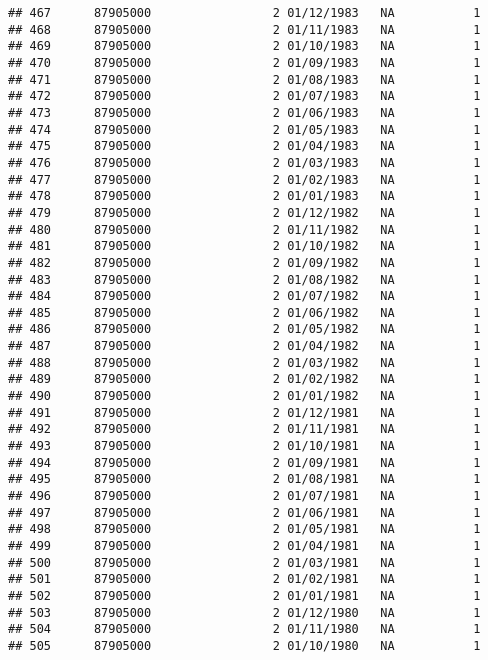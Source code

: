 \documentclass[
]{article}
\begin{document}
\begin{verbatim}
## 467      87905000                 2 01/12/1983   NA           1
## 468      87905000                 2 01/11/1983   NA           1
## 469      87905000                 2 01/10/1983   NA           1
## 470      87905000                 2 01/09/1983   NA           1
## 471      87905000                 2 01/08/1983   NA           1
## 472      87905000                 2 01/07/1983   NA           1
## 473      87905000                 2 01/06/1983   NA           1
## 474      87905000                 2 01/05/1983   NA           1
## 475      87905000                 2 01/04/1983   NA           1
## 476      87905000                 2 01/03/1983   NA           1
## 477      87905000                 2 01/02/1983   NA           1
## 478      87905000                 2 01/01/1983   NA           1
## 479      87905000                 2 01/12/1982   NA           1
## 480      87905000                 2 01/11/1982   NA           1
## 481      87905000                 2 01/10/1982   NA           1
## 482      87905000                 2 01/09/1982   NA           1
## 483      87905000                 2 01/08/1982   NA           1
## 484      87905000                 2 01/07/1982   NA           1
## 485      87905000                 2 01/06/1982   NA           1
## 486      87905000                 2 01/05/1982   NA           1
## 487      87905000                 2 01/04/1982   NA           1
## 488      87905000                 2 01/03/1982   NA           1
## 489      87905000                 2 01/02/1982   NA           1
## 490      87905000                 2 01/01/1982   NA           1
## 491      87905000                 2 01/12/1981   NA           1
## 492      87905000                 2 01/11/1981   NA           1
## 493      87905000                 2 01/10/1981   NA           1
## 494      87905000                 2 01/09/1981   NA           1
## 495      87905000                 2 01/08/1981   NA           1
## 496      87905000                 2 01/07/1981   NA           1
## 497      87905000                 2 01/06/1981   NA           1
## 498      87905000                 2 01/05/1981   NA           1
## 499      87905000                 2 01/04/1981   NA           1
## 500      87905000                 2 01/03/1981   NA           1
## 501      87905000                 2 01/02/1981   NA           1
## 502      87905000                 2 01/01/1981   NA           1
## 503      87905000                 2 01/12/1980   NA           1
## 504      87905000                 2 01/11/1980   NA           1
## 505      87905000                 2 01/10/1980   NA           1

\end{verbatim}
\end{document}
